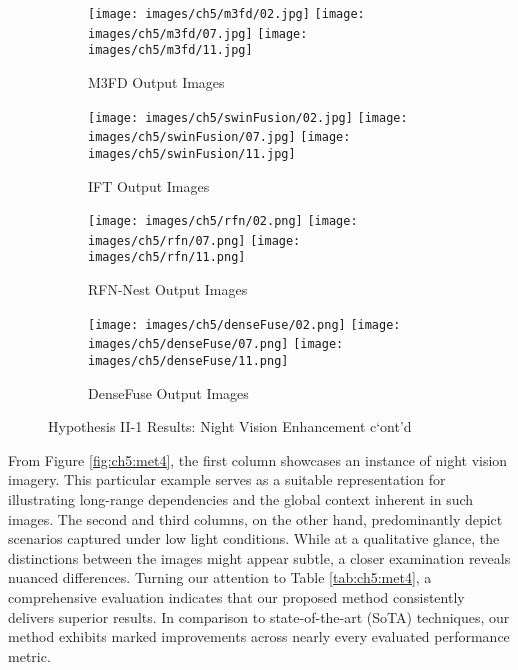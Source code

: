 \begin{figure}[htbp]
    \centering
    \begin{subfigure}[b]{\textwidth}
        \texttt{[image: images/ch5/m3fd/02.jpg]}
        \texttt{[image: images/ch5/m3fd/07.jpg]}
        \texttt{[image: images/ch5/m3fd/11.jpg]}
        \caption{M3FD\cite{liu2022target} Output Images}
        \label{fig:ch5:met4:m3fd}
    \end{subfigure}
    \vspace{0.01cm}
    \begin{subfigure}[b]{\textwidth}
        \texttt{[image: images/ch5/swinFusion/02.jpg]}
        \texttt{[image: images/ch5/swinFusion/07.jpg]}
        \texttt{[image: images/ch5/swinFusion/11.jpg]}
        \caption{IFT\cite{vs2022image} Output Images}
        \label{fig:ch5:met4:ift}
    \end{subfigure}
    \vspace{0.01cm}
    \begin{subfigure}[b]{\textwidth}
        \texttt{[image: images/ch5/rfn/02.png]}
        \texttt{[image: images/ch5/rfn/07.png]}
        \texttt{[image: images/ch5/rfn/11.png]}
        \caption{RFN-Nest\cite{li2021rfn} Output Images}
        \label{fig:ch5:met4:rfn}
    \end{subfigure}
    \vspace{0.01cm}
    \begin{subfigure}[b]{\textwidth}
        \texttt{[image: images/ch5/denseFuse/02.png]}
        \texttt{[image: images/ch5/denseFuse/07.png]}
        \texttt{[image: images/ch5/denseFuse/11.png]}
        \caption{DenseFuse\cite{li2019infrared} Output Images}
        \label{fig:ch5:met4:densefuse}
    \end{subfigure}
    \caption{Hypothesis II-1 Results: Night Vision Enhancement c`ont'd}
\end{figure}

From Figure \ref{fig:ch5:met4}, the first column showcases an instance of night vision imagery. This particular example serves as a suitable representation for illustrating long-range dependencies and the global context inherent in such images. The second and third columns, on the other hand, predominantly depict scenarios captured under low light conditions. While at a qualitative glance, the distinctions between the images might appear subtle, a closer examination reveals nuanced differences. Turning our attention to Table \ref{tab:ch5:met4}, a comprehensive evaluation indicates that our proposed method consistently delivers superior results. In comparison to state-of-the-art (SoTA) techniques, our method exhibits marked improvements across nearly every evaluated performance metric.

